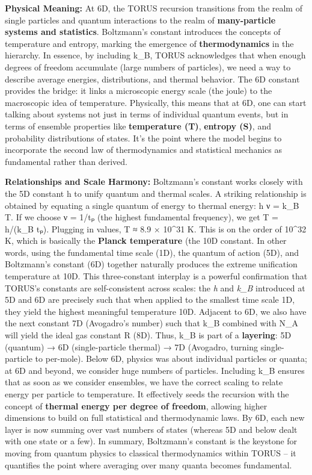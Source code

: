 \documentclass[
]{article}
\begin{document}
\textbf{Physical Meaning:} At 6D, the TORUS recursion transitions from
the realm of single particles and quantum interactions to the realm of
\textbf{many-particle systems and statistics}. Boltzmann's constant
introduces the concepts of temperature and entropy, marking the
emergence of \textbf{thermodynamics} in the hierarchy\hspace{0pt}. In
essence, by including k\_B, TORUS acknowledges that when enough degrees
of freedom accumulate (large numbers of particles), we need a way to
describe average energies, distributions, and thermal behavior. The 6D
constant provides the bridge: it links a microscopic energy scale (the
joule) to the macroscopic idea of temperature. Physically, this means
that at 6D, one can start talking about systems not just in terms of
individual quantum events, but in terms of ensemble properties like
\textbf{temperature (T)}, \textbf{entropy (S)}, and probability
distributions of states. It's the point where the model begins to
incorporate the second law of thermodynamics and statistical mechanics
as fundamental rather than derived.

\textbf{Relationships and Scale Harmony:} Boltzmann's constant works
closely with the 5D constant h to unify quantum and thermal scales. A
striking relationship is obtained by equating a single quantum of energy
to thermal energy: h ν = k\_B T. If we choose ν = 1/tₚ (the highest
fundamental frequency), we get T = h/(k\_B tₚ). Plugging in values, T ≈
8.9 × 10\^{}31 K\hspace{0pt}. This is on the order of 10\^{}32 K, which
is basically the \textbf{Planck temperature} (the 10D constant. In other
words, using the fundamental time scale (1D), the quantum of action
(5D), and Boltzmann's constant (6D) together naturally produces the
extreme unification temperature at 10D. This three-constant interplay is
a powerful confirmation that TORUS's constants are self-consistent
across scales: the \emph{h} and \emph{k\_B} introduced at 5D and 6D are
precisely such that when applied to the smallest time scale 1D, they
yield the highest meaningful temperature 10D\hspace{0pt}. Adjacent to
6D, we also have the next constant 7D (Avogadro's number) such that k\_B
combined with N\_A will yield the ideal gas constant R (8D)\hspace{0pt}.
Thus, k\_B is part of a \textbf{layering}: 5D (quantum) → 6D
(single-particle thermal) → 7D (Avogadro, turning single-particle to
per-mole). Below 6D, physics was about individual particles or quanta;
at 6D and beyond, we consider huge numbers of particles. Including k\_B
ensures that as soon as we consider ensembles, we have the correct
scaling to relate energy per particle to temperature. It effectively
seeds the recursion with the concept of \textbf{thermal energy per
degree of freedom}, allowing higher dimensions to build on full
statistical and thermodynamic laws. By 6D, each new layer is now summing
over vast numbers of states (whereas 5D and below dealt with one state
or a few). In summary, Boltzmann's constant is the keystone for moving
from quantum physics to classical thermodynamics within TORUS -- it
quantifies the point where averaging over many quanta becomes
fundamental.
\end{document}
